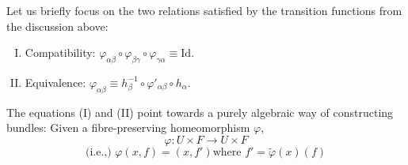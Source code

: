 \documentclass[11pt,a4paper]{article}
\begin{document}

Let us briefly focus on the two relations satisfied by the transition functions from the discussion above:
\begin{enumerate}[(I)]
    \item Compatibility: $\varphi_{\alpha\beta}\circ\varphi_{\beta\gamma}\circ\varphi_{\gamma\alpha} \equiv \text{Id}$.
    \item Equivalence: $\varphi_{\alpha\beta} \equiv h_{\beta}^{-1}\circ\varphi'_{\alpha\beta}\circ h_{\alpha}$.
\end{enumerate}


The equations (I) and (II) point towards a purely algebraic way of constructing bundles: Given a fibre-preserving homeomorphism $\varphi$,
$$\varphi: U\times F \rightarrow U\times F$$
$$\text{(i.e.,) } \varphi(x, f) = (x, f')   \text{where }f' = \widetilde{\varphi}(x)(f)$$

\end{document}
